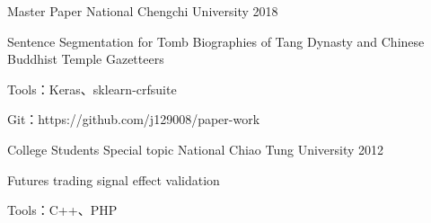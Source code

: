 

\begin{cventries}
  \cventry
    {Master} %
    {Paper} %
    {National Chengchi University} %
    {2018} %
    {
      \begin{cvitems} %
        \item {Sentence Segmentation for Tomb Biographies of Tang Dynasty and Chinese Buddhist Temple Gazetteers}
        \item {Tools：Keras、sklearn-crfsuite}
        \item {Git：https://github.com/j129008/paper-work}
      \end{cvitems}
    }

  \cventry
    {College Students} %
    {Special topic} %
    {National Chiao Tung University} %
    {2012} %
    {
      \begin{cvitems} %
      \item {Futures trading signal effect validation}
        \item {Tools：C++、PHP}
      \end{cvitems}
    }

\end{cventries}
